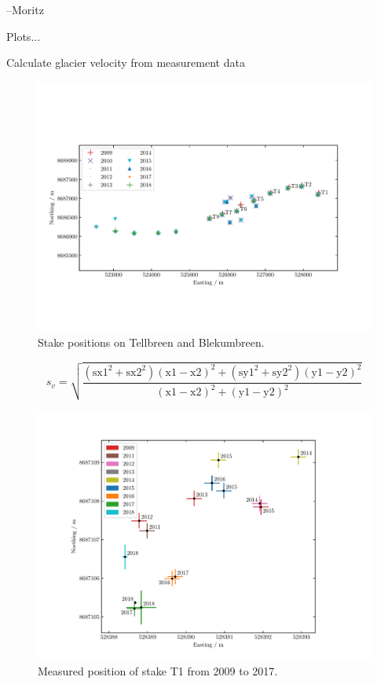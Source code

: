 --Moritz


Plots...

Calculate glacier velocity from measurement data

\begin{figure}[H]
    \centering
    \includegraphics[width=\textwidth]{../fig/stakePositions.pdf}
    \caption{Stake positions on Tellbreen and Blekumbreen.}
    \label{GF:fig:stakepos}
\end{figure}

\begin{equation}
s_v = 
\sqrt{\frac
{\left(\text{sx1}^2+\text{sx2}^2\right)(\text{x1}-\text{x2})^2+
\left(\text{sy1}^2+\text{sy2}^2\right)(\text{y1}-\text{y2})^2}
{(\text{x1}-\text{x2})^2+(\text{y1}-\text{y2})^2}}
\end{equation}


\begin{figure}[H]
    \centering
    \includegraphics[width=\textwidth]{../fig/T1_2d.pdf}
    \caption{Measured position of stake T1 from 2009 to 2017.}
    \label{GF:fig:T1_2d}
\end{figure}
